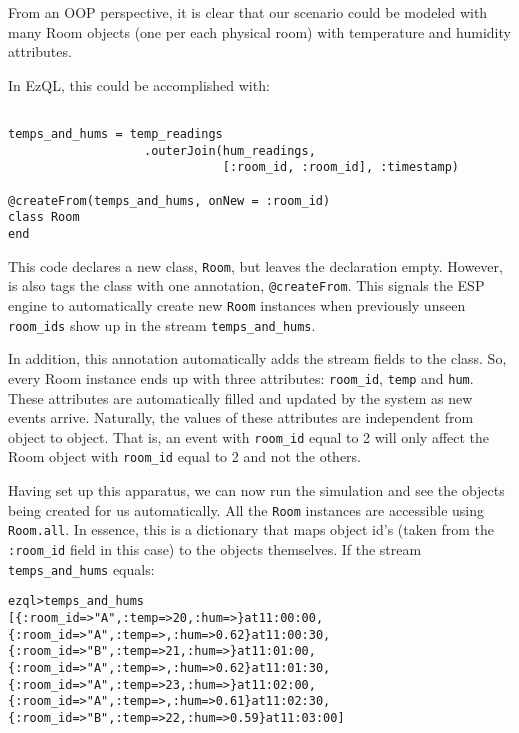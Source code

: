 \documentclass{report}
\newenvironment{evaluation}
{
  \framed
  \begin{alltt}
}
{
  \end{alltt}
  \endframed
}
\begin{document}
From an OOP perspective, it is clear that our scenario could be
modeled with many Room objects (one per each physical room) with
temperature and humidity attributes.

In EzQL, this could be accomplished with:

\begin{verbatim}

temps_and_hums = temp_readings
                   .outerJoin(hum_readings,
                              [:room_id, :room_id], :timestamp)

@createFrom(temps_and_hums, onNew = :room_id)
class Room
end
\end{verbatim}

This code declares a new class, \verb=Room=, but leaves the
declaration empty. However, is also tags the class with one
annotation, \verb=@createFrom=. This signals the ESP engine to
automatically create new \verb=Room= instances when previously unseen
\verb=room_ids= show up in the stream \verb=temps_and_hums=.

In addition, this annotation automatically adds the stream fields to
the class. So, every Room instance ends up with three attributes:
\verb=room_id=, \verb=temp= and \verb=hum=. These attributes are
automatically filled and updated by the system as new events
arrive. Naturally, the values of these attributes are independent from
object to object. That is, an event with \verb=room_id= equal to 2
will only affect the Room object with \verb=room_id= equal to 2 and
not the others.

Having set up this apparatus, we can now run the simulation and see
the objects being created for us automatically. All the \verb=Room=
instances are accessible using \verb=Room.all=. In essence, this is a
dictionary that maps object id's (taken from the \verb=:room_id= field
in this case) to the objects themselves. If the stream \verb=temps_and_hums= equals:

\begin{evaluation}
ezql> temps_and_hums
[\{ :room_id => "A", :temp =>  20, :hum =>       \} at 11:00:00,
 \{ :room_id => "A", :temp =>    , :hum =>  0.62 \} at 11:00:30,
 \{ :room_id => "B", :temp =>  21, :hum =>       \} at 11:01:00,
 \{ :room_id => "A", :temp =>    , :hum =>  0.62 \} at 11:01:30,
 \{ :room_id => "A", :temp =>  23, :hum =>       \} at 11:02:00,
 \{ :room_id => "A", :temp =>    , :hum =>  0.61 \} at 11:02:30,
 \{ :room_id => "B", :temp =>  22, :hum =>  0.59 \} at 11:03:00]
\end{evaluation}
\end{document}
